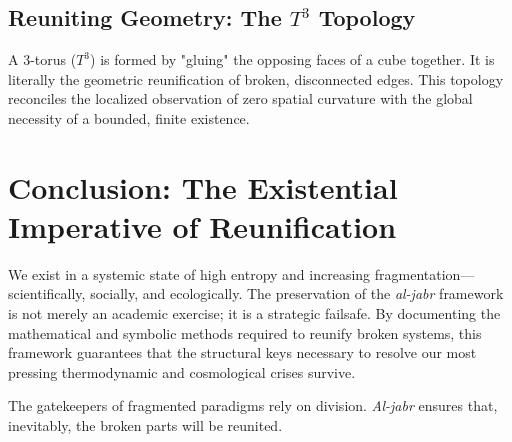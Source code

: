 \documentclass[aps,prd,11pt,onecolumn,superscriptaddress,nofootinbib,floatfix]{revtex4-2}
\begin{document}
\subsection{Reuniting Geometry: The $T^3$ Topology}
A 3-torus ($T^3$) is formed by "gluing" the opposing faces of a cube together. It is literally the geometric reunification of broken, disconnected edges. This topology reconciles the localized observation of zero spatial curvature with the global necessity of a bounded, finite existence. 

\section{Conclusion: The Existential Imperative of Reunification}
\label{sec:conclusion}

We exist in a systemic state of high entropy and increasing fragmentation—scientifically, socially, and ecologically. The preservation of the \textit{al-jabr} framework is not merely an academic exercise; it is a strategic failsafe. By documenting the mathematical and symbolic methods required to reunify broken systems, this framework guarantees that the structural keys necessary to resolve our most pressing thermodynamic and cosmological crises survive. 

The gatekeepers of fragmented paradigms rely on division. \textit{Al-jabr} ensures that, inevitably, the broken parts will be reunited.




\end{document}
